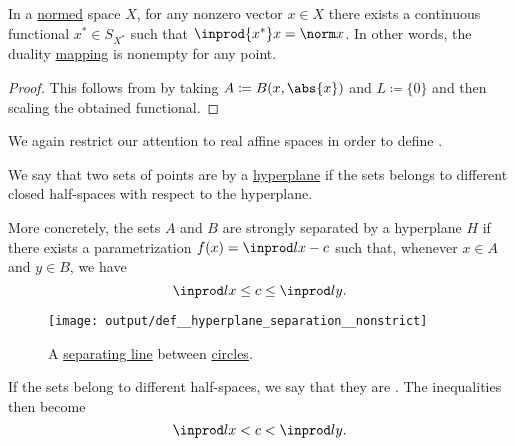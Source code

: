 \begin{corollary}\label{thm:hahn_banach_implies_duality_mapping_nonempty}
  In a \hyperref[def:norm]{normed} space \( X \), for any nonzero vector \( x \in X \) there exists a continuous functional \( x^* \in S_{X^*} \) such that \( \inprod {x^*} x = \norm x \). In other words, the duality \hyperref[def:duality_mapping]{mapping} is nonempty for any point.
\end{corollary}
\begin{proof}
  This follows from  by taking \( A \coloneqq B(x, \abs{x}) \) and \( L \coloneqq \{ 0 \} \) and then scaling the obtained functional.
\end{proof}

\begin{definition}\label{def:hyperplane_separation}
  We again restrict our attention to real affine spaces in order to define .

  \begin{thmenum}
     We say that two sets of points are  by a \hyperref[def:affine_hyperplane]{hyperplane} if the sets belongs to different closed half-spaces with respect to the hyperplane.

    More concretely, the sets \( A \) and \( B \) are strongly separated by a hyperplane \( H \) if there exists a parametrization \( f(x) = \inprod l x - c \) such that, whenever \( x \in A \) and \( y \in B \), we have
    \begin{equation}\label{eq:def:hyperplane_separation/nonstrict}
      \inprod l x \leq c \leq \inprod l y.
    \end{equation}

    \begin{figure}[!ht]
      \centering
      \texttt{[image: output/def\_\_hyperplane\_separation\_\_nonstrict]}
      \caption{A \hyperref[def:hyperplane_separation/nonstrict]{separating line} between \hyperref[def:circle]{circles}.}\label{fig:def:hyperplane_separation/nonstrict}
    \end{figure}

     If the sets belong to different  half-spaces, we say that they are . The inequalities then become
    \begin{equation}\label{eq:def:hyperplane_separation/strong}
      \inprod l x < c < \inprod l y.
    \end{equation}


\end{thmenum}
\end{definition}
